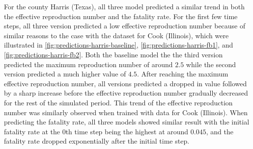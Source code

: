 For the county Harris (Texas), all three model predicted a similar trend in both the effective reproduction number and the fatality rate.
For the first few time steps, all three version predicted a low effective reproduction number because of similar reasons to the case with the dataset for Cook (Illinois), which were illustrated in \autoref{fig:predictions-harris-baseline}, \autoref{fig:predictions-harris-fb1}, and \autoref{fig:predictions-harris-fb2}.
Both the baseline model the the third version predicted the maximum reproduction number of around $2.5$ while the second version predicted a much higher value of $4.5$.
After reaching the maximum effective reproduction number, all versions predicted a dropped in value followed by a sharp increase before the effective reproduction number gradually decreased for the rest of the simulated period.
This trend of the effective reproduction number was similarly observed when trained with data for Cook (Illinois).
When predicting the fatality rate, all three models showed similar result with the initial fatality rate at the 0th time step being the highest at around $0.045$, and the fatality rate dropped exponentially after the initial time step.

